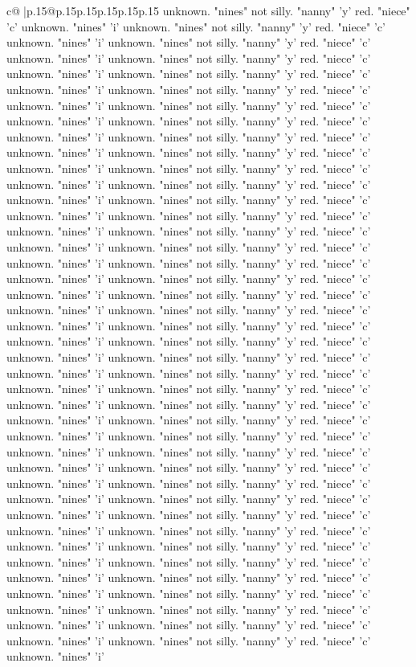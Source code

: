 \documentclass{article}
\begin{document}
{\begin{supertabular}{c@{$\;$}|p{.15\linewidth}@{}p{.15\linewidth}p{.15\linewidth}p{.15\linewidth}p{.15\linewidth}p{.15\linewidth}}
{{{unknown. "nines" not silly. "nanny" 'y' red. "niece" 'c' unknown. "nines" 'i' unknown. "nines" not silly. "nanny" 'y' red. "niece" 'c' unknown. "nines" 'i' unknown. "nines" not silly. "nanny" 'y' red. "niece" 'c' unknown. "nines" 'i' unknown. "nines" not silly. "nanny" 'y' red. "niece" 'c' unknown. "nines" 'i' unknown. "nines" not silly. "nanny" 'y' red. "niece" 'c' unknown. "nines" 'i' unknown. "nines" not silly. "nanny" 'y' red. "niece" 'c' unknown. "nines" 'i' unknown. "nines" not silly. "nanny" 'y' red. "niece" 'c' unknown. "nines" 'i' unknown. "nines" not silly. "nanny" 'y' red. "niece" 'c' unknown. "nines" 'i' unknown. "nines" not silly. "nanny" 'y' red. "niece" 'c' unknown. "nines" 'i' unknown. "nines" not silly. "nanny" 'y' red. "niece" 'c' unknown. "nines" 'i' unknown. "nines" not silly. "nanny" 'y' red. "niece" 'c' unknown. "nines" 'i' unknown. "nines" not silly. "nanny" 'y' red. "niece" 'c' unknown. "nines" 'i' unknown. "nines" not silly. "nanny" 'y' red. "niece" 'c' unknown. "nines" 'i' unknown. "nines" not silly. "nanny" 'y' red. "niece" 'c' unknown. "nines" 'i' unknown. "nines" not silly. "nanny" 'y' red. "niece" 'c' unknown. "nines" 'i' unknown. "nines" not silly. "nanny" 'y' red. "niece" 'c' unknown. "nines" 'i' unknown. "nines" not silly. "nanny" 'y' red. "niece" 'c' unknown. "nines" 'i' unknown. "nines" not silly. "nanny" 'y' red. "niece" 'c' unknown. "nines" 'i' unknown. "nines" not silly. "nanny" 'y' red. "niece" 'c' unknown. "nines" 'i' unknown. "nines" not silly. "nanny" 'y' red. "niece" 'c' unknown. "nines" 'i' unknown. "nines" not silly. "nanny" 'y' red. "niece" 'c' unknown. "nines" 'i' unknown. "nines" not silly. "nanny" 'y' red. "niece" 'c' unknown. "nines" 'i' unknown. "nines" not silly. "nanny" 'y' red. "niece" 'c' unknown. "nines" 'i' unknown. "nines" not silly. "nanny" 'y' red. "niece" 'c' unknown. "nines" 'i' unknown. "nines" not silly. "nanny" 'y' red. "niece" 'c' unknown. "nines" 'i' unknown. "nines" not silly. "nanny" 'y' red. "niece" 'c' unknown. "nines" 'i' unknown. "nines" not silly. "nanny" 'y' red. "niece" 'c' unknown. "nines" 'i' unknown. "nines" not silly. "nanny" 'y' red. "niece" 'c' unknown. "nines" 'i' unknown. "nines" not silly. "nanny" 'y' red. "niece" 'c' unknown. "nines" 'i' unknown. "nines" not silly. "nanny" 'y' red. "niece" 'c' unknown. "nines" 'i' unknown. "nines" not silly. "nanny" 'y' red. "niece" 'c' unknown. "nines" 'i' unknown. "nines" not silly. "nanny" 'y' red. "niece" 'c' unknown. "nines" 'i' unknown. "nines" not silly. "nanny" 'y' red. "niece" 'c' unknown. "nines" 'i' unknown. "nines" not silly. "nanny" 'y' red. "niece" 'c' unknown. "nines" 'i' unknown. "nines" not silly. "nanny" 'y' red. "niece" 'c' unknown. "nines" 'i' unknown. "nines" not silly. "nanny" 'y' red. "niece" 'c' unknown. "nines" 'i' unknown. "nines" not silly. "nanny" 'y' red. "niece" 'c' unknown. "nines" 'i' unknown. "nines" not silly. "nanny" 'y' red. "niece" 'c' unknown. "nines" 'i' unknown. "nines" not silly. "nanny" 'y' red. "niece" 'c' unknown. "nines" 'i' unknown. "nines" not silly. "nanny" 'y' red. "niece" 'c' unknown. "nines" 'i' unknown. "nines" not silly. "nanny" 'y' red. "niece" 'c' unknown. "nines" 'i' }}}
\end{supertabular}}
\end{document}
